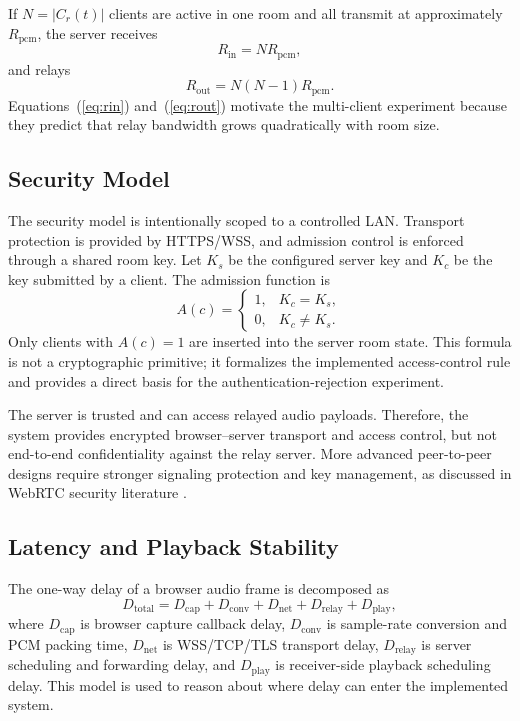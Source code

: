\documentclass[conference]{IEEEtran}
\begin{document}
If $N=|C_r(t)|$ clients are active in one room and all transmit at approximately $R_{\mathrm{pcm}}$, the server receives
\begin{equation}
    R_{\mathrm{in}} = NR_{\mathrm{pcm}},
    \label{eq:rin}
\end{equation}
and relays
\begin{equation}
    R_{\mathrm{out}} = N(N-1)R_{\mathrm{pcm}}.
    \label{eq:rout}
\end{equation}
Equations~(\ref{eq:rin}) and~(\ref{eq:rout}) motivate the multi-client experiment because they predict that relay bandwidth grows quadratically with room size.

\subsection{Security Model}

The security model is intentionally scoped to a controlled LAN. Transport protection is provided by HTTPS/WSS, and admission control is enforced through a shared room key. Let $K_s$ be the configured server key and $K_c$ be the key submitted by a client. The admission function is
\begin{equation}
    A(c)=
    \begin{cases}
        1, & K_c=K_s,\\
        0, & K_c\neq K_s.
    \end{cases}
    \label{eq:admission}
\end{equation}
Only clients with $A(c)=1$ are inserted into the server room state. This formula is not a cryptographic primitive; it formalizes the implemented access-control rule and provides a direct basis for the authentication-rejection experiment.

The server is trusted and can access relayed audio payloads. Therefore, the system provides encrypted browser--server transport and access control, but not end-to-end confidentiality against the relay server. More advanced peer-to-peer designs require stronger signaling protection and key management, as discussed in WebRTC security literature \cite{ieee_webrtc_signaling_security}.

\subsection{Latency and Playback Stability}

The one-way delay of a browser audio frame is decomposed as
\begin{equation}
    D_{\mathrm{total}} =
    D_{\mathrm{cap}} + D_{\mathrm{conv}} + D_{\mathrm{net}}
    + D_{\mathrm{relay}} + D_{\mathrm{play}},
    \label{eq:latency}
\end{equation}
where $D_{\mathrm{cap}}$ is browser capture callback delay, $D_{\mathrm{conv}}$ is sample-rate conversion and PCM packing time, $D_{\mathrm{net}}$ is WSS/TCP/TLS transport delay, $D_{\mathrm{relay}}$ is server scheduling and forwarding delay, and $D_{\mathrm{play}}$ is receiver-side playback scheduling delay. This model is used to reason about where delay can enter the implemented system.
\end{document}
